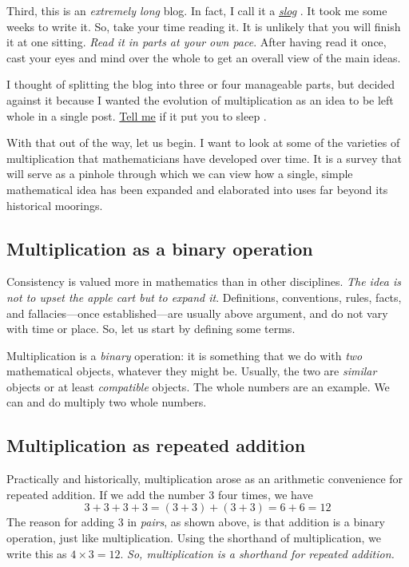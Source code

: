 \documentclass[
  a4paper,
]{article}
\begin{document}
Third, this is an \emph{extremely long} blog. In fact, I call it a
\href{https://www.vocabulary.com/dictionary/slog}{\emph{slog}}
 \normalfont. It took me some weeks to write it. So, take
your time reading it. It is unlikely that you will finish it at one
sitting. \emph{Read it in parts at your own pace}. After having read it
once, cast your eyes and mind over the whole to get an overall view of
the main ideas.

I thought of splitting the blog into three or four manageable parts, but
decided against it because I wanted the evolution of multiplication as
an idea to be left whole in a single post.
\href{mailto:feedback.swanlotus@gmail.com}{Tell me} if it put you to
sleep  \normalfont.

With that out of the way, let us begin. I want to look at some of the
varieties of multiplication that mathematicians have developed over
time. It is a survey that will serve as a pinhole through which we can
view how a single, simple mathematical idea has been expanded and
elaborated into uses far beyond its historical moorings.

\hypertarget{multiplication-as-a-binary-operation}{%
\subsection{Multiplication as a binary
operation}\label{multiplication-as-a-binary-operation}}

Consistency is valued more in mathematics than in other disciplines.
\emph{The idea is not to upset the apple cart but to expand it}.
Definitions, conventions, rules, facts, and fallacies---once
established---are usually above argument, and do not vary with time or
place. So, let us start by defining some terms.

Multiplication is a \emph{binary} operation: it is something that we do
with \emph{two} mathematical objects, whatever they might be. Usually,
the two are \emph{similar} objects or at least \emph{compatible}
objects. The whole numbers are an example. We can and do multiply two
whole numbers.

\hypertarget{multiplication-as-repeated-addition}{%
\subsection{Multiplication as repeated
addition}\label{multiplication-as-repeated-addition}}

Practically and historically, multiplication arose as an arithmetic
convenience for repeated addition. If we add the number \(3\) four
times, we have \[
3 + 3 + 3 + 3 = (3 + 3) + (3 + 3) = 6 + 6 = 12
\] The reason for adding \(3\) in \emph{pairs}, as shown above, is that
addition is a binary operation, just like multiplication. Using the
shorthand of multiplication, we write this as \(4 \times 3 = 12\).
\emph{So, multiplication is a shorthand for repeated addition.}
\end{document}
